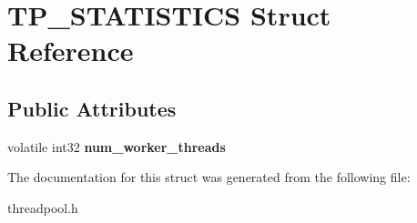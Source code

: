 \hypertarget{structTP__STATISTICS}{}\section{T\+P\+\_\+\+S\+T\+A\+T\+I\+S\+T\+I\+CS Struct Reference}
\label{structTP__STATISTICS}
\subsection*{Public Attributes}
\begin{DoxyCompactItemize}
\item 
\mbox{\label{structTP__STATISTICS_abe9ad94b88d3ac36033187889e401ee5}} 
volatile int32 {\bfseries num\+\_\+worker\+\_\+threads}
\end{DoxyCompactItemize}


The documentation for this struct was generated from the following file\+:\begin{DoxyCompactItemize}
\item 
threadpool.\+h\end{DoxyCompactItemize}
